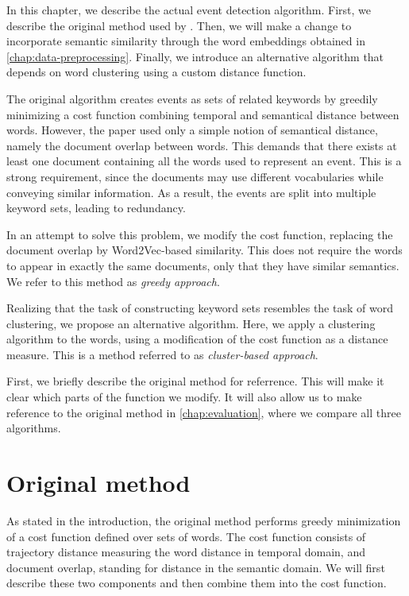 In this chapter, we describe the actual event detection algorithm. First, we describe the original method used by \cite{event-detection}. Then, we will make a change to incorporate semantic similarity through the word embeddings obtained in \autoref{chap:data-preprocessing}. Finally, we introduce an alternative algorithm that depends on word clustering using a custom distance function.

The original algorithm creates events as sets of related keywords by greedily minimizing a cost function combining temporal and semantical distance between words. However, the paper used only a simple notion of semantical distance, namely the document overlap between words. This demands that there exists at least one document containing all the words used to represent an event. This is a strong requirement, since the documents may use different vocabularies while conveying similar information.  As a result, the events are split into multiple keyword sets, leading to redundancy.

In an attempt to solve this problem, we modify the cost function, replacing the document overlap by Word2Vec-based similarity. This does not require the words to appear in exactly the same documents, only that they have similar semantics. We refer to this method as \textit{greedy approach}.

Realizing that the task of constructing keyword sets resembles the task of word clustering, we propose an alternative algorithm. Here, we apply a clustering algorithm to the words, using a modification of the cost function as a distance measure. This is a method referred to as \textit{cluster-based approach}.

First, we briefly describe the original method for referrence. This will make it clear which parts of the function we modify. It will also allow us to make reference to the original method in \autoref{chap:evaluation}, where we compare all three algorithms.

\section{Original method}
As stated in the introduction, the original method performs greedy minimization of a cost function defined over sets of words. The cost function consists of trajectory distance measuring the word distance in temporal domain, and document overlap, standing for distance in the semantic domain. We will first describe these two components and then combine them into the cost function.

